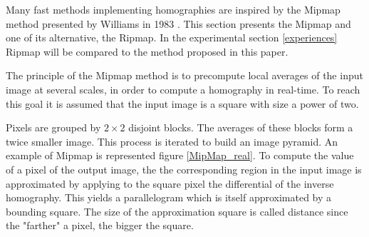 
Many fast methods implementing homographies are inspired by the Mipmap method presented by Williams in 1983 \cite{williams1983pyramidal}. This section presents the Mipmap and one of its alternative, the Ripmap. In the experimental section \ref{experiences} Ripmap will be compared to the method proposed in this paper.


\label{Mipmap}
The principle of the Mipmap method is to precompute local averages of the input image at several scales, in order to compute a homography in real-time. To reach this goal it is assumed that the input image is a square with size a power of two.

Pixels are grouped by $2\times 2$ disjoint blocks. The averages of these blocks form a twice smaller image. This process is iterated to build an image pyramid. An example of Mipmap is represented figure \ref{MipMap_real}. To compute the value of a pixel of the output image, the the corresponding region in the input image is approximated by applying to the square pixel the differential of the inverse homography. This yields a parallelogram which is itself approximated by a bounding square. The size of the approximation square is called distance since the "farther" a pixel, the bigger the square.



